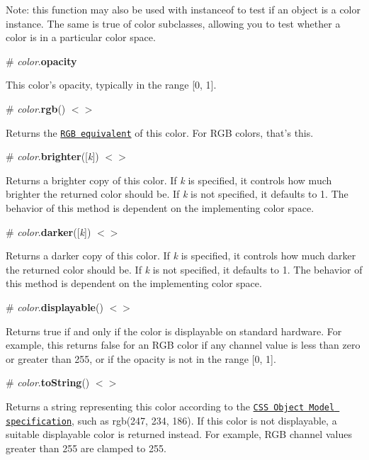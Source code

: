 Note\+: this function may also be used with {\ttfamily instanceof} to test if an object is a color instance. The same is true of color subclasses, allowing you to test whether a color is in a particular color space.

\label{_color_opacity}%
\# {\itshape color}.{\bfseries opacity}

This color’s opacity, typically in the range \mbox{[}0, 1\mbox{]}.

\label{_color_rgb}%
\# {\itshape color}.{\bfseries rgb}() \href{https://github.com/d3/d3-color/blob/master/src/color.js#L209}{\tt $<$$>$}

Returns the \href{#rgb}{\tt R\+GB equivalent} of this color. For R\+GB colors, that’s {\ttfamily this}.

\label{_color_brighter}%
\# {\itshape color}.{\bfseries brighter}(\mbox{[}{\itshape k}\mbox{]}) \href{https://github.com/d3/d3-color/blob/master/src/color.js#L221}{\tt $<$$>$}

Returns a brighter copy of this color. If {\itshape k} is specified, it controls how much brighter the returned color should be. If {\itshape k} is not specified, it defaults to 1. The behavior of this method is dependent on the implementing color space.

\label{_color_darker}%
\# {\itshape color}.{\bfseries darker}(\mbox{[}{\itshape k}\mbox{]}) \href{https://github.com/d3/d3-color/blob/master/src/color.js#L225}{\tt $<$$>$}

Returns a darker copy of this color. If {\itshape k} is specified, it controls how much darker the returned color should be. If {\itshape k} is not specified, it defaults to 1. The behavior of this method is dependent on the implementing color space.

\label{_color_displayable}%
\# {\itshape color}.{\bfseries displayable}() \href{https://github.com/d3/d3-color/blob/master/src/color.js#L169}{\tt $<$$>$}

Returns true if and only if the color is displayable on standard hardware. For example, this returns false for an R\+GB color if any channel value is less than zero or greater than 255, or if the opacity is not in the range \mbox{[}0, 1\mbox{]}.

\label{_color_toString}%
\# {\itshape color}.{\bfseries to\+String}() \href{https://github.com/d3/d3-color/blob/master/src/color.js#L172}{\tt $<$$>$}

Returns a string representing this color according to the \href{https://drafts.csswg.org/cssom/#serialize-a-css-component-value}{\tt C\+SS Object Model specification}, such as {\ttfamily rgb(247, 234, 186)}. If this color is not displayable, a suitable displayable color is returned instead. For example, R\+GB channel values greater than 255 are clamped to 255.

